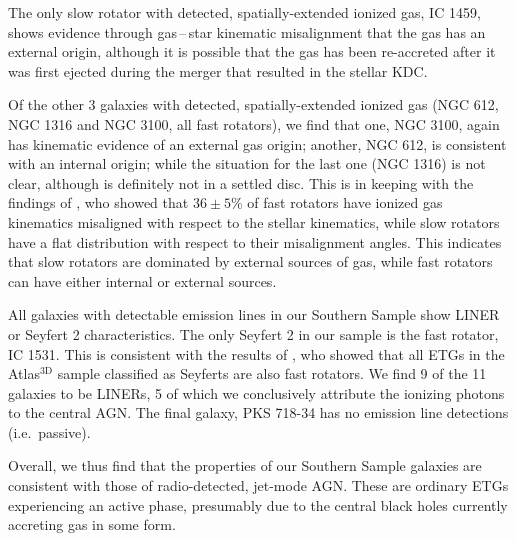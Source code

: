 	The only slow rotator with detected, spatially-extended ionized gas, IC 1459, shows evidence through gas\,--\,star kinematic misalignment that the gas has an external origin, although it is possible that the gas has been re-accreted after it was first ejected during the merger that resulted in the stellar KDC. 

	Of the other 3 galaxies with detected, spatially-extended ionized gas (NGC 612, NGC 1316 and NGC 3100, all fast rotators), we find that one, NGC 3100, again has kinematic evidence of an external gas origin; another, NGC 612, is consistent with an internal origin; while the situation for the last one (NGC 1316) is not clear, although is definitely not in a settled disc. This is in keeping with the findings of \citet{Davis2011a}, who showed that $36\pm5$\% of fast rotators have ionized gas kinematics misaligned with respect to the stellar kinematics, while slow rotators have a flat distribution with respect to their misalignment angles. This indicates that slow rotators are dominated by external sources of gas, while fast rotators can have either internal or external sources. 

	All galaxies with detectable emission lines in our Southern Sample show LINER or Seyfert 2 characteristics. The only Seyfert 2 in our sample is the fast rotator, IC 1531. This is consistent with the results of \citet{Nyland2016}, who showed that all ETGs in the Atlas$^\text{3D}$ sample classified as Seyferts are also fast rotators. We find 9 of the 11 galaxies to be LINERs, 5 of which we conclusively attribute the ionizing photons to the central AGN. The final galaxy, PKS 718-34 has no emission line detections (i.e.\ passive). 

	Overall, we thus find that the properties of our Southern Sample galaxies are consistent with those of radio-detected, jet-mode AGN. These are ordinary ETGs experiencing an active phase, presumably due to the central black holes currently accreting gas in some form. 

